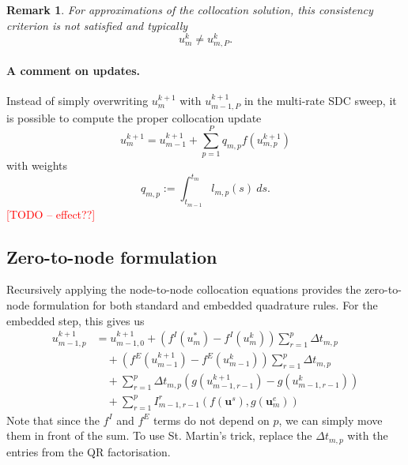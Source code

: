 \documentclass{article}
\newtheorem{remark}{Remark}
\newcommand{\ve}[1]{\mathbf{#1}}
\newcommand{\todo}[1]{\textcolor{red}{[TODO -- #1]}}
\begin{document}
%
%
\begin{remark}
For approximations of the collocation solution, this consistency criterion is not satisfied and typically
\begin{equation}
	u_{m}^{k} \neq u_{m,P}^{k}.
\end{equation}
\end{remark}

\paragraph{A comment on updates.}
Instead of simply overwriting $u^{k+1}_{m}$ with $u^{k+1}_{m-1,P}$ in the multi-rate SDC sweep, it is possible to compute the proper collocation update
\begin{equation}
	u^{k+1}_{m} = u^{k+1}_{m-1} + \sum_{p=1}^{P} q_{m, p} f(u^{k+1}_{m,p})
\end{equation}
with weights
\begin{equation}
	q_{m,p} := \int_{t_{m-1}}^{t_{m}} l_{m,p}(s)~ds.
\end{equation}
\todo{effect??}

\subsection*{Zero-to-node formulation}
Recursively applying the node-to-node collocation equations provides the zero-to-node formulation for both standard and embedded quadrature rules.
For the embedded step, this gives us
\begin{subequations}
\begin{align}
	u^{k+1}_{m-1,p} &= u^{k+1}_{m-1,0} + \left( f^{I}(u^{*}_{m}) - f^{I}(u^k_m)  \right)  \sum_{r=1}^{p} \Delta t_{m,p} \\
				& \quad +  \left( f^{E}(u^{k+1}_{m-1}) - f^{E}(u^k_{m-1}) \right) \sum_{r=1}^{p} \Delta t_{m,p} \\
				& \quad + \sum_{r=1}^{p} \Delta t_{m,p} \left( g(u^{k+1}_{m-1,r-1}) - g(u^k_{m-1,r-1}) \right) \\
				& \quad + \sum_{r=1}^{p} I_{m-1,r-1}^{r}\left( f(\ve{u}^{s}) , g(\ve{u}^{e}_m) \right)
\end{align}
\end{subequations}
Note that since the $f^I$ and $f^E$ terms do not depend on $p$, we can simply move them in front of the sum.
To use St. Martin's trick, replace the $\Delta t_{m,p}$ with the entries from the QR factorisation.
\end{document}
